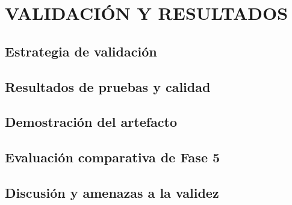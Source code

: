 \setcounter{subsection}{0}
\section{VALIDACIÓN Y RESULTADOS}

\subsection{Estrategia de validación}

\subsection{Resultados de pruebas y calidad}

\subsection{Demostración del artefacto}

\subsection{Evaluación comparativa de Fase 5}

\subsection{Discusión y amenazas a la validez}
